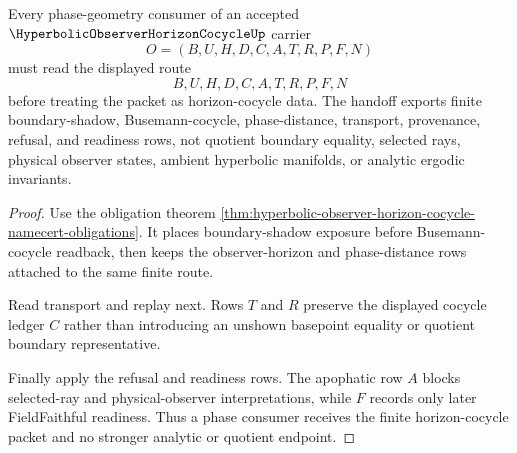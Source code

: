 \begin{theorem}
\label{thm:hyperbolic-observer-horizon-cocycle-phase-handoff}
Every phase-geometry consumer of an accepted $\HyperbolicObserverHorizonCocycleUp$ carrier
$$
O=(B,U,H,D,C,A,T,R,P,F,N)
$$
must read the displayed route
$$
B,U,H,D,C,A,T,R,P,F,N
$$
before treating the packet as horizon-cocycle data. The handoff exports finite boundary-shadow, Busemann-cocycle, phase-distance, transport, provenance, refusal, and readiness rows, not quotient boundary equality, selected rays, physical observer states, ambient hyperbolic manifolds, or analytic ergodic invariants.
\end{theorem}
\begin{proof}
Use the obligation theorem \autoref{thm:hyperbolic-observer-horizon-cocycle-namecert-obligations}. It places boundary-shadow exposure before Busemann-cocycle readback, then keeps the observer-horizon and phase-distance rows attached to the same finite route.

Read transport and replay next. Rows $T$ and $R$ preserve the displayed cocycle ledger $C$ rather than introducing an unshown basepoint equality or quotient boundary representative.

Finally apply the refusal and readiness rows. The apophatic row $A$ blocks selected-ray and physical-observer interpretations, while $F$ records only later FieldFaithful readiness. Thus a phase consumer receives the finite horizon-cocycle packet and no stronger analytic or quotient endpoint.
\end{proof}


\begin{closurestatus}{\HyperbolicObserverHorizonCocycleUp}
  \theoryclosure{\seedClosure}
  \formalstatus{\unformalizedV}
\end{closurestatus}
